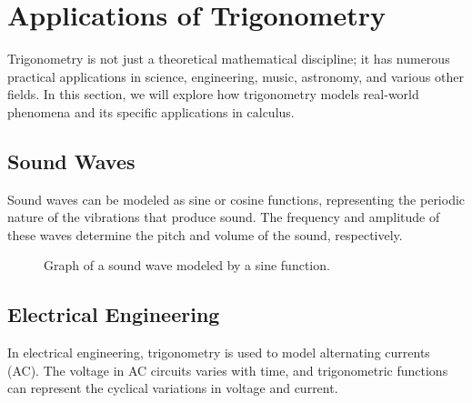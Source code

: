 \documentclass[a4paper,12pt]{book}
\begin{document}

\section{Applications of Trigonometry}
\label{sec:applications_trigonometry}

Trigonometry is not just a theoretical mathematical discipline; it has numerous practical applications in science, engineering, music, astronomy, and various other fields. In this section, we will explore how trigonometry models real-world phenomena and its specific applications in calculus.

\subsection{Sound Waves}
\label{subsec:sound_waves}
Sound waves can be modeled as sine or cosine functions, representing the periodic nature of the vibrations that produce sound. The frequency and amplitude of these waves determine the pitch and volume of the sound, respectively.

\begin{figure}[h]
\centering
{}
\caption{Graph of a sound wave modeled by a sine function.}
\label{fig:sound_wave}
\end{figure}

\subsection{Electrical Engineering}
\label{subsec:electrical_engineering}
In electrical engineering, trigonometry is used to model alternating currents (AC). The voltage in AC circuits varies with time, and trigonometric functions can represent the cyclical variations in voltage and current.
\end{document}
